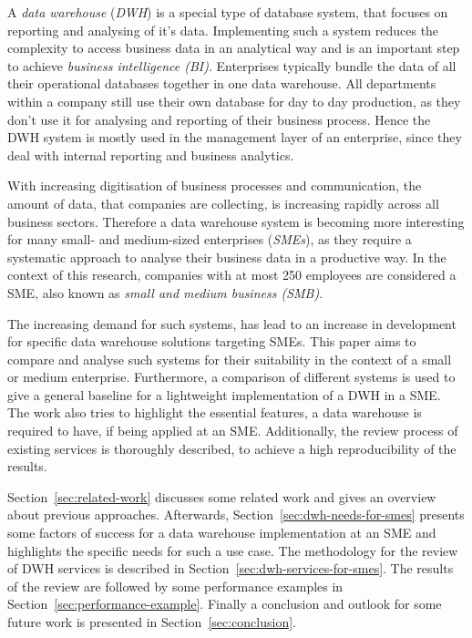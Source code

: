 \documentclass[../paper.tex]{subfiles}
\begin{document}
A \textit{data warehouse} (\textit{DWH}) is a special type of database system, that focuses on reporting and analysing of it's data. Implementing such a system reduces the complexity to access business data in an analytical way and is an important step to achieve \textit{business intelligence (BI)}. Enterprises typically bundle the data of all their operational databases together in one data warehouse. All departments within a company still use their own database for day to day production, as they don't use it for analysing and reporting of their business process. Hence the DWH system is mostly used in the management layer of an enterprise, since they deal with internal reporting and business analytics.

With increasing digitisation of business processes and communication, the amount of data, that companies are collecting, is increasing rapidly across all business sectors. Therefore a data warehouse system is becoming more interesting for many small- and medium-sized enterprises (\textit{SMEs}), as they require a systematic approach to analyse their business data in a productive way. In the context of this research, companies with at most 250 employees are considered a SME, also known as \textit{small and medium business (SMB)}.

The increasing demand for such systems, has lead to an increase in development for specific data warehouse solutions targeting SMEs. This paper aims to compare and analyse such systems for their suitability in the context of a small or medium enterprise. Furthermore, a comparison of different systems is used to give a general baseline for a lightweight implementation of a DWH in a SME. The work also tries to highlight the essential features, a data warehouse is required to have, if being applied at an SME. Additionally, the review process of existing services is thoroughly described, to achieve a high reproducibility of the results.

Section~\ref{sec:related-work} discusses some related work and gives an overview about previous approaches. Afterwards, Section~\ref{sec:dwh-needs-for-smes} presents some factors of success for a data warehouse implementation at an SME and highlights the specific needs for such a use case. The methodology for the review of DWH services is described in Section~\ref{sec:dwh-services-for-smes}. The results of the review are followed by some performance examples in Section~\ref{sec:performance-example}. Finally a conclusion and outlook for some future work is presented in Section~\ref{sec:conclusion}.
\end{document}
